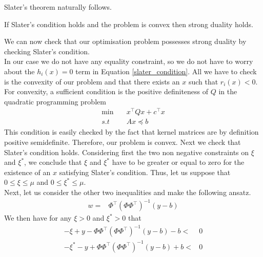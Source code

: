 Slater's theorem naturally follows.
\begin{theorem}
    If Slater's condition holds and the problem is convex then strong duality holds.
\end{theorem}
We can now check that our optimisation problem possesses strong duality by checking Slater's condition.
\\
In our case we do not have any equality constraint, so we do not have to worry about the $h_i(x)=0$ term in Equation \ref{slater_condition}. All we have to check is the convexity of our problem and that there exists an $x$ such that $r_i(x)<0$.
For convexity, a sufficient condition is the positive definiteness of $Q$ in the quadratic programming problem 
\begin{equation}
    \begin{aligned}
        \min \quad & x^\intercal Q x+ c^\intercal x \\        
        s.t \quad& Ax\preceq b
    \end{aligned}
\end{equation}
This condition is easily checked by the fact that kernel matrices are by definition positive semidefinite.
Therefore, our problem is convex.
Next we check that Slater's condition holds. Considering first the two non negative constraints on $\xi$ and $\xi^*$, we conclude that $\xi$  and $\xi^*$ have to be greater or equal to zero for the existence of an $x$ satisfying Slater's condition. Thus, let us suppose that $0 \leq \xi \leq \mu$ and $0 \leq \xi^* \leq \mu$.
\\
Next, let us consider the other two inequalities and make the following ansatz.
\\
\begin{equation}
    \begin{aligned}
        w=& \Phi^\intercal(\Phi \Phi^\intercal)^{-1} (y-b)
    \end{aligned}
\end{equation}
We then have for any $\xi > 0$ and $\xi^* > 0$  that
\begin{equation}
    \begin{aligned}
        -\xi + y -\Phi\Phi^\intercal(\Phi \Phi^\intercal)^{-1}(y-b)-b<&0
        \\
        -\xi^* - y +\Phi\Phi^\intercal(\Phi \Phi^\intercal)^{-1}(y-b)+b<&0
    \end{aligned}
\end{equation}
